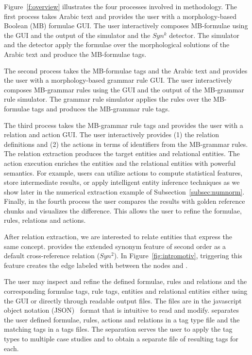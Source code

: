 


Figure~\ref{f:overview} illustrates the four processes involved in 
\framework methodology. 
The first process takes Arabic text and provides the user 
with a morphology-based Boolean (MB) formulae GUI. 
The user interactively composes MB-formulae using the GUI and the output 
of the simulator and the $Syn^k$ detector. 
The simulator and the detector apply the formulae over the morphological solutions 
of the Arabic text and produce the MB-formulae tags. 

The second process takes the MB-formulae tags and the Arabic text and provides
the user with a morphology-based grammar rule GUI. 
The user interactively composes MB-grammar rules using the GUI and the output 
of the MB-grammar rule simulator. 
The grammar rule simulator applies the rules over the MB-formulae tags and 
produces the MB-grammar rule tags. 

The third process takes the MB-grammar rule tags and provides the user with 
a relation and action GUI. 
The user interactively provides (1) the relation definitions and 
(2) the actions in terms of identifiers from the MB-grammar 
rules.
The relation extraction produces the target entities and relational
entities. 
The action execution enriches the entities and the relational entities
with powerful semantics.
For example, users can utilize actions to compute statistical features, 
store intermediate results, 
or apply intelligent entity inference techniques
as we show later in the numerical extraction example of 
Subsection~\ref{subsec:numnorm}.
%
Finally, in the fourth process the user compares the results with golden
reference chunks and visualizes the difference. 
This allows the user to refine the formulae, rules, relations and actions. 

After relation extraction, we are interested to relate 
entities that express the same concept.
\framework provides the extended synonym feature of second order as 
a default cross-reference relation ($Syn^2$).
In Figure~\ref{fig:intromotiv}, triggering this feature creates the 
edge labeled with  
between the nodes  and .



The user may inspect and refine the defined formulae, rules and relations and 
the corresponding formulae tags, rule tags, entities and relational entities
either using the GUI or directly through readable output files. 
The files are in the javascript object notation (JSON)~\cite{nolan2014javascript} 
format that is intuitive to read and modify. 
\framework separates the user defined formulae, rules, actions and relations in
a \framework tag type file and the 
matching tags in a tags files. 
The separation serves the user to apply the tag types to multiple case studies 
and to obtain a separate file of resulting tags for each. 


